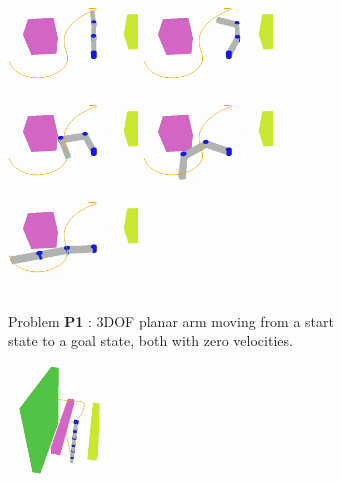 \documentclass[letterpaper, 10 pt, conference]{ieeeconf}  %
\begin{document}
\begin{figure}[t!]
	\centering
	\begin{subfigure}[b]{\textwidth}
	    \centering
		\includegraphics[height=2.45cm]{fig/planning_efficiency/3dof_1}
		\includegraphics[height=2.45cm]{fig/planning_efficiency/3dof_2}
		\includegraphics[height=2.45cm]{fig/planning_efficiency/3dof_3}
		\includegraphics[height=2.45cm]{fig/planning_efficiency/3dof_4}
		\includegraphics[height=2.45cm]{fig/planning_efficiency/3dof_5}
		\caption{\captionstyle Problem \textbf{P1} : 3DOF planar arm moving from a start state to a goal state, both with zero velocities.}
		\vspace{6pt}
		\label{fig:planning_efficiency:3dof:example}
	\end{subfigure}
	\begin{subfigure}[b]{\textwidth}
	    \centering
		\includegraphics[height=3cm]{fig/planning_efficiency/6dof_1}

\end{subfigure}
\end{figure}
\end{document}

